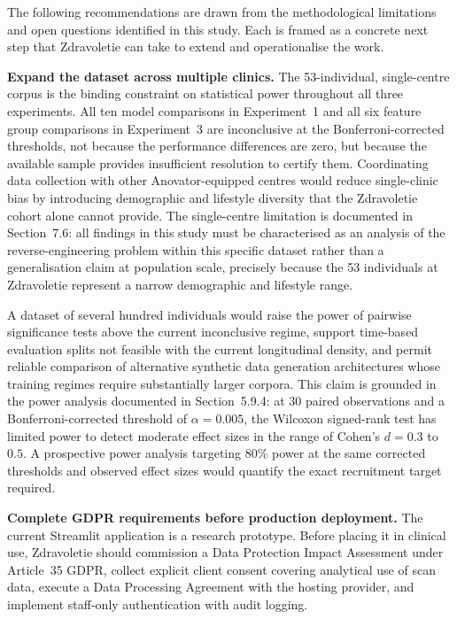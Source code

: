 \documentclass[11pt,a4paper]{report}
\begin{document}
The following recommendations are drawn from the methodological limitations and open questions
identified in this study. Each is framed as a concrete next step that Zdravoletie can take to
extend and operationalise the work.

\textbf{Expand the dataset across multiple clinics.} The 53-individual, single-centre corpus is
the binding constraint on statistical power throughout all three experiments. All ten model
comparisons in Experiment~1 and all six feature group comparisons in Experiment~3 are inconclusive
at the Bonferroni-corrected thresholds, not because the performance differences are zero, but
because the available sample provides insufficient resolution to certify them. Coordinating data
collection with other Anovator-equipped centres would reduce single-clinic bias by introducing
demographic and lifestyle diversity that the Zdravoletie cohort alone cannot provide. The
single-centre limitation is documented in Section~7.6: all findings in this study must be
characterised as an analysis of the reverse-engineering problem within this specific dataset rather
than a generalisation claim at population scale, precisely because the 53 individuals at Zdravoletie
represent a narrow demographic and lifestyle range.

A dataset of several hundred individuals would raise the power of pairwise significance tests above
the current inconclusive regime, support time-based evaluation splits not feasible with the current
longitudinal density, and permit reliable comparison of alternative synthetic data generation
architectures whose training regimes require substantially larger corpora. This claim is grounded in
the power analysis documented in Section~5.9.4: at 30 paired observations and a
Bonferroni-corrected threshold of $\alpha = 0.005$, the Wilcoxon signed-rank test has limited power
to detect moderate effect sizes in the range of Cohen's $d = 0.3$ to $0.5$. A prospective power
analysis targeting 80\% power at the same corrected thresholds and observed effect sizes would
quantify the exact recruitment target required.

\textbf{Complete GDPR requirements before production deployment.} The current Streamlit
application is a research prototype. Before placing it in clinical use, Zdravoletie should
commission a Data Protection Impact Assessment under Article~35 GDPR, collect explicit client
consent covering analytical use of scan data, execute a Data Processing Agreement with the hosting
provider, and implement staff-only authentication with audit logging.
\end{document}
